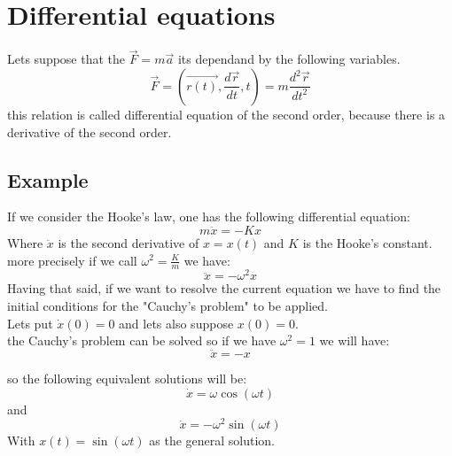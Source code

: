 \documentclass{article}
\begin{document}
            \section{Differential equations}
                Lets suppose that the $\vec{F} = m \vec{a}$ its dependand by the following variables. 
                \begin{equation*}
                    \vec{F} = (\vec{r(t)}, \frac{d\vec{r}}{dt}, t) = m \frac{d^2 \vec{r}}{d t^2}
                \end{equation*}
                this relation is called differential equation of the second order, because there is a derivative of the second order.
                \subsection*{Example}
                    If we consider the Hooke's law, one has the following differential equation:
                    \begin{equation*}
                        m\ddot{x} = - K x 
                    \end{equation*}
                    Where $\ddot{x}$ is the second derivative of $x = x(t)$ and $K$ is the Hooke's constant.
                    more precisely if we call $\omega^2 = \frac{K}{m}$ we have:
                    \begin{equation*}
                        \ddot{x} = -\omega^2 x
                    \end{equation*}
                    Having that said, if we want to resolve the current equation we have to find the initial conditions for the "Cauchy's problem" to be applied. \\
                    Lets put $\dot{x}(0) = 0$ and lets also suppose $x(0) = 0$. \\
                    the Cauchy's problem can be solved so if we have $\omega^2 = 1$ we will have:
                    \begin{equation*}
                        \ddot{x} = -x 
                    \end{equation*}

                    so the following equivalent solutions will be:
                    \begin{equation*}
                        \dot{x} = \omega \cos(\omega t)
                    \end{equation*}
                    and 
                    \begin{equation*}
                        \dot{x} = -\omega^2 \sin(\omega t)
                    \end{equation*}
                    With $x(t) = \sin(\omega t)$ as the general solution.
                              
\end{document}

